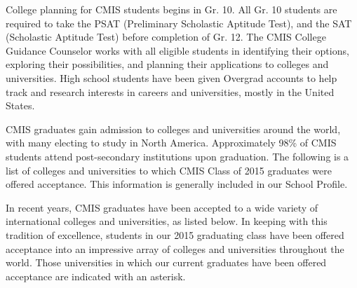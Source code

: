 College planning for CMIS students begins in Gr. 10.  All Gr. 10 students are required to take the PSAT (Preliminary Scholastic Aptitude Test), and the SAT (Scholastic Aptitude Test) before completion of Gr. 12.  The CMIS College Guidance Counselor works with all eligible students in identifying their options, exploring their possibilities, and planning their applications to colleges and universities.  High school students have been given Overgrad accounts to help track and research interests in careers and universities, mostly in the United States.  



CMIS graduates gain admission to colleges and universities around the world, with many electing to study in North America. Approximately 98\% of CMIS students attend post­-secondary institutions upon graduation. The following is a list of colleges and universities to which CMIS Class of 2015 graduates were offered acceptance.  This information is generally included in our School Profile.

\href{https://docs.google.com/document/d/1i8tDt8omsO9Zz4Zj40uOpUz8twkbGHYSk_PDs3Rqup4/edit}{}

In recent years, CMIS graduates have been accepted to a wide variety of international colleges and universities, as listed below. In keeping with this tradition of excellence, students in our 2015 graduating class have been offered acceptance into an impressive array of colleges and universities throughout the world. Those universities in which our current graduates have been offered acceptance are indicated with an asterisk. 

